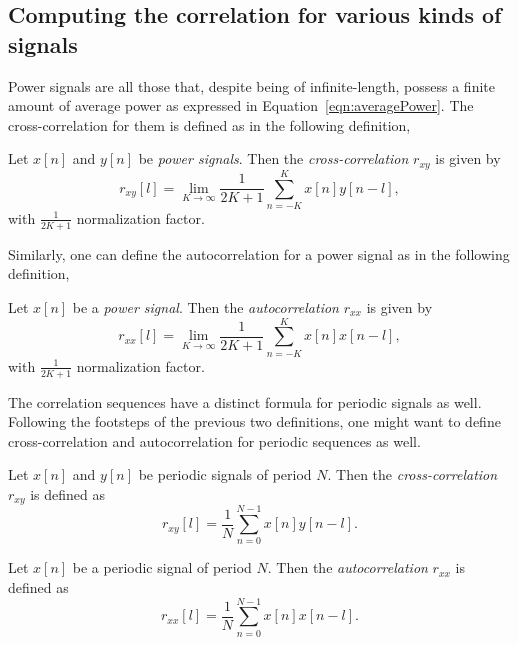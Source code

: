 \documentclass[\documentfontsize, twocolumn]{\classname}
\begin{document}
\subsection{Computing the correlation for various kinds of signals}

Power signals are all those that, despite being of infinite-length, possess a finite amount of average power as expressed in Equation~\ref{eqn:averagePower}. The cross-correlation for them is defined as in the following definition,
\begin{defin}
    Let $x[n]$ and $y[n]$ be \emph{power signals}. Then the \emph{cross-correlation} $r_{xy}$ is given by
    \begin{equation}\label{eqn:crossCorrelationPowerSignals}
        r_{xy}[l] = \lim_{K\rightarrow \infty} \frac 1 {2K+1} \sum_{n=-K}^K x[n]y[n-l],
    \end{equation}
    with $\frac 1 {2K+1}$ normalization factor.
\end{defin}

Similarly, one can define the autocorrelation for a power signal as in the following definition,
\begin{defin}
    Let $x[n]$ be a \emph{power signal}. Then the \emph{autocorrelation} $r_{xx}$ is given by
    \begin{equation}\label{eqn:autoCorrelationPowerSignals}
        r_{xx}[l] = \lim_{K\rightarrow \infty} \frac 1 {2K+1} \sum_{n=-K}^K x[n]x[n-l],
    \end{equation}
    with $\frac 1 {2K+1}$ normalization factor.
\end{defin}

The correlation sequences have a distinct formula for periodic signals as well. Following the footsteps of the previous two definitions, one might want to define cross-correlation and autocorrelation for periodic sequences as well.

\begin{defin}
    Let $x[n]$ and $y[n]$ be periodic signals of period $N$. Then the \emph{cross-correlation} $r_{xy}$ is defined as
    \begin{equation}\label{eqn:crossCorrelationPeriodicSignals}
        r_{xy}[l] = \frac 1 N \sum_{n=0}^{N-1} x[n]y[n-l].
    \end{equation}
\end{defin}

\begin{defin}
    Let $x[n]$ be a periodic signal of period $N$. Then the \emph{autocorrelation} $r_{xx}$ is defined as
    \begin{equation}\label{eqn:autoCorrelationPeriodicSignals}
        r_{xx}[l] = \frac 1 N \sum_{n=0}^{N-1} x[n]x[n-l].
    \end{equation}
\end{defin}
\end{document}
